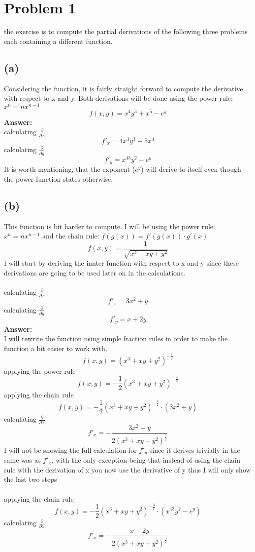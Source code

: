\section{Problem 1}
the exercise is to compute the partial derivations of the following
three problems each containing a different function.
\subsection{(a)}
Considering the function, it is fairly straight forward to compute the derivative with respect
to x and y. Both derivations will be done using the power rule: $x^n = nx^{n-1}$
$$f(x,y) = x^4y^3+x^5-e^y$$
\textbf{Answer:}
\\
calculating $\frac{\partial}{\partial x}$
$$f'_{x} = 4x^3y^3+5x^4$$
calculating $\frac{\partial}{\partial y}$
$$f'_{y} = x^43y^2-e^y$$
It is worth mentioning, that the exponent ($e^y$) will derive to itself even though
the power function states otherwise.
\subsection{(b)}
This function is bit harder to compute. I will be using the power rule: $x^n = nx^{n-1}$ and the chain rule: $f(g(x)) = f'(g(x)) \cdot g'(x)$
$$f(x,y) = \frac{1}{\sqrt{x^3+xy+y^2}}$$
I will start by deriving the innter function with respect to x and y since these derivations
are going to be used later on in the calculations.
\\
\\
calculating $\frac{\partial}{\partial x}$
$$f'_{x} = 3x^2+y$$
calculating $\frac{\partial}{\partial y}$
$$f'_{y} = x+2y$$
\textbf{Answer:}\\
I will rewrite the function using simple fraction rules in order to make the function
a bit easier to work with.
$$f(x,y) = (x^3+xy+y^2)^{-\frac{1}{2}}$$
applying the power rule
$$f(x,y) = -\frac{1}{2}(x^3+xy+y^2)^{-\frac{3}{2}}$$
applying the chain rule
$$f(x,y) = -\frac{1}{2}(x^3+xy+y^2)^{-\frac{3}{2}} \cdot (3x^2+y)$$
calculating $\frac{\partial}{\partial x}$
$$f'_{x} = -\frac{3x^2+y}{2(x^3+xy+y^2)^{\frac{3}{2}}}$$
I will not be showing the full calculation for $f'_{y}$ since it derives trivially in the same was as $f'_{x}$,
with the only exception being that instead of using the chain rule with the derivation of x you now use the derivative of y
thus I will only show the last two steps
\\
\\
applying the chain rule
$$f(x,y) = -\frac{1}{2}(x^3+xy+y^2)^{-\frac{3}{2}} \cdot (x^43y^2-e^y)$$
calculating $\frac{\partial}{\partial x}$
$$f'_{x} = -\frac{x+2y}{2(x^3+xy+y^2)^{\frac{3}{2}}}$$
